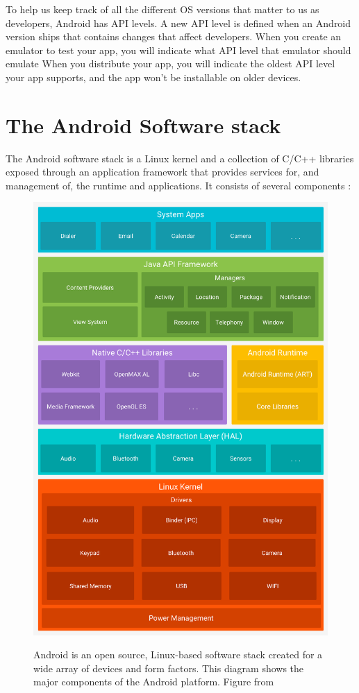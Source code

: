 To help us keep track of all the different OS versions that matter to us as developers, Android has API levels.
A new API level is defined when an Android version ships that contains changes that affect developers.
When you create an emulator to test your app, you will indicate what API level that emulator should emulate
When you distribute your app, you will indicate the oldest API level your app supports, and the app won't be installable on older devices.

\section{The Android Software stack}
The Android software stack is a Linux kernel and a collection of C/C++ libraries exposed through an application framework that provides services for, and management of, the runtime and applications.
It consists of several components \cite{Google2017}:

\begin{figure}[ht]
	\centering
	\includegraphics[width=\textwidth]{images/hello/android-stack.png}
	\label{fig:stack}
	\caption{Android is an open source, Linux-based software stack created for a wide array of devices and form factors.
			This diagram shows the major components of the Android platform. Figure from \cite{Google2017}}
\end{figure}

